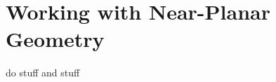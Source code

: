 \documentclass[]{spie}  %
\begin{document}
\appendix
\section{Working with Near-Planar Geometry}
do stuff and stuff


\end{document}
